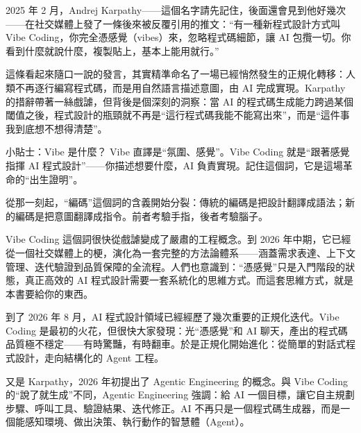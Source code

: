 


2025 年 2 月，Andrej Karpathy——這個名字請先記住，後面還會見到他好幾次——在社交媒體上發了一條後來被反覆引用的推文：“有一種新程式設計方式叫 Vibe Coding，你完全憑感覺（vibes）來，忽略程式碼細節，讓 AI 包攬一切。你看到什麼就說什麼，複製貼上，基本上能用就行。”

這條看起來隨口一說的發言，其實精準命名了一場已經悄然發生的正規化轉移：人類不再逐行編寫程式碼，而是用自然語言描述意圖，由 AI 完成實現。Karpathy 的措辭帶著一絲戲謔，但背後是個深刻的洞察：當 AI 的程式碼生成能力跨過某個閾值之後，程式設計的瓶頸就不再是“這行程式碼我能不能寫出來”，而是“這件事我到底想不想得清楚”。

\begin{tcbinfo}{小貼士：Vibe 是什麼？}
Vibe 直譯是“氛圍、感覺”。Vibe Coding 就是“跟著感覺指揮 AI 程式設計”——你描述想要什麼，AI 負責實現。記住這個詞，它是這場革命的“出生證明”。

\end{tcbinfo}

從那一刻起，“編碼”這個詞的含義開始分裂：傳統的編碼是把設計翻譯成語法；新的編碼是把意圖翻譯成指令。前者考驗手指，後者考驗腦子。

Vibe Coding 這個詞很快從戲謔變成了嚴肅的工程概念。到 2026 年中期，它已經從一個社交媒體上的梗，演化為一套完整的方法論體系——涵蓋需求表達、上下文管理、迭代驗證到品質保障的全流程。人們也意識到：“憑感覺”只是入門階段的狀態，真正高效的 AI 程式設計需要一套系統化的思維方式。而這套思維方式，就是本書要給你的東西。


到了 2026 年 8 月，AI 程式設計領域已經經歷了幾次重要的正規化迭代。Vibe Coding 是最初的火花，但很快大家發現：光“憑感覺”和 AI 聊天，產出的程式碼品質極不穩定——有時驚豔，有時翻車。於是正規化開始進化：從簡單的對話式程式設計，走向結構化的 Agent 工程。

又是 Karpathy，2026 年初提出了 Agentic Engineering 的概念。與 Vibe Coding 的“說了就生成”不同，Agentic Engineering 強調：給 AI 一個目標，讓它自主規劃步驟、呼叫工具、驗證結果、迭代修正。AI 不再只是一個程式碼生成器，而是一個能感知環境、做出決策、執行動作的智慧體（Agent）。

